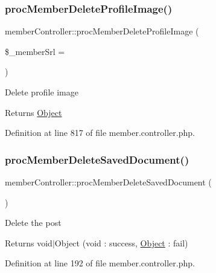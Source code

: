 \subsubsection{\texorpdfstring{proc\+Member\+Delete\+Profile\+Image()}{procMemberDeleteProfileImage()}}
{\footnotesize\ttfamily member\+Controller\+::proc\+Member\+Delete\+Profile\+Image (\begin{DoxyParamCaption}\item[{}]{\$\+\_\+member\+Srl = {} }\end{DoxyParamCaption})}

Delete profile image

\begin{DoxyReturn}{Returns}
\hyperlink{classObject}{Object} 
\end{DoxyReturn}


Definition at line 817 of file member.\+controller.\+php.

\hypertarget{classmemberController_a4e154a138901b9b941f9949576c47f00}{}\label{classmemberController_a4e154a138901b9b941f9949576c47f00} 
\subsubsection{\texorpdfstring{proc\+Member\+Delete\+Saved\+Document()}{procMemberDeleteSavedDocument()}}
{\footnotesize\ttfamily member\+Controller\+::proc\+Member\+Delete\+Saved\+Document (\begin{DoxyParamCaption}{ }\end{DoxyParamCaption})}

Delete the post

\begin{DoxyReturn}{Returns}
void$\vert$\+Object (void \+: success, \hyperlink{classObject}{Object} \+: fail) 
\end{DoxyReturn}


Definition at line 192 of file member.\+controller.\+php.

\hypertarget{classmemberController_ae1eb0a3ef4da18d06c4fce0dc4fbbe24}{}\label{classmemberController_ae1eb0a3ef4da18d06c4fce0dc4fbbe24} 

